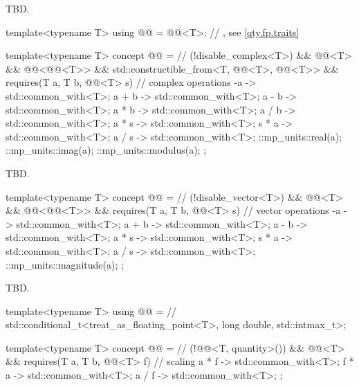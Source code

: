 \pnum
TBD.

\begin{itemdecl}
template<typename T>
using @@ = @@<T>;  // \expos, see \ref{qty.fp.traits}

template<typename T>
concept @@ =  // \expos
  (!disable_complex<T>) && @@<T> && @@<@@<T>> &&
  std::constructible_from<T, @@<T>, @@<T>> &&
  requires(T a, T b, @@<T> s) {
    // complex operations
    { -a } -> std::common_with<T>;
    { a + b } -> std::common_with<T>;
    { a - b } -> std::common_with<T>;
    { a * b } -> std::common_with<T>;
    { a / b } -> std::common_with<T>;
    { a * s } -> std::common_with<T>;
    { s * a } -> std::common_with<T>;
    { a / s } -> std::common_with<T>;
    ::mp_units::real(a);
    ::mp_units::imag(a);
    ::mp_units::modulus(a);
  };
\end{itemdecl}

\pnum
TBD.

\begin{itemdecl}
template<typename T>
concept @@ =  // \expos
  (!disable_vector<T>) && @@<T> && @@<@@<T>> &&
  requires(T a, T b, @@<T> s) {
    // vector operations
    { -a } -> std::common_with<T>;
    { a + b } -> std::common_with<T>;
    { a - b } -> std::common_with<T>;
    { a * s } -> std::common_with<T>;
    { s * a } -> std::common_with<T>;
    { a / s } -> std::common_with<T>;
    ::mp_units::magnitude(a);
  };
\end{itemdecl}

\pnum
TBD.

\begin{itemdecl}
template<typename T>
using @@ =  // \expos
  std::conditional_t<treat_as_floating_point<T>, long double, std::intmax_t>;

template<typename T>
concept @@ =  // \expos
  (!@@<T, quantity>()) && @@<T> &&
  requires(T a, T b, @@<T> f) {
    // scaling
    { a * f } -> std::common_with<T>;
    { f * a } -> std::common_with<T>;
    { a / f } -> std::common_with<T>;
  };
\end{itemdecl}

